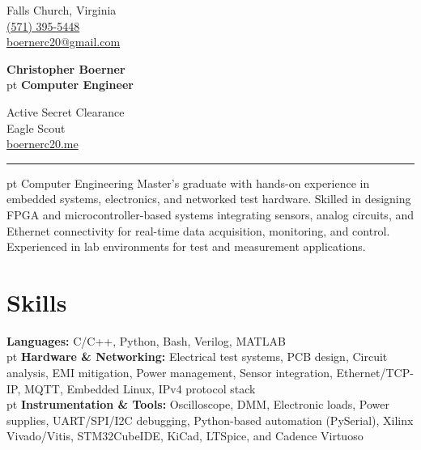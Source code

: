 \documentclass[9pt, letterpaper]{extarticle}
\newenvironment{threecolentry}[3][]{
    \onecolentry
    \def\thirdColumn{#3}
    \setcolumnwidth{, \fill, \fill, \fill}
    \begin{paracol}{3}
    {\raggedright #2} \switchcolumn
    \begin{center}  %
}{
    \end{center}
    \switchcolumn \raggedleft \thirdColumn
    \end{paracol}
    \endonecolentry
} %
\let\hrefWithoutArrow\href
\begin{document}
    \newcommand{\AND}{\unskip
        \cleaders\copy\ANDbox\hskip\wd\ANDbox
        \ignorespaces
    }
    \newsavebox\ANDbox
    \sbox\ANDbox{$|$}
    \begin{threecolentry}
        {
            Falls Church, Virginia\\
            \hrefWithoutArrow{tel:+1-571-395-5448}{(571) 395-5448}\\
            \hrefWithoutArrow{mailto:boernerc20@gmail.com}{boernerc20@gmail.com}
        }
        {
            Active Secret Clearance \\
            Eagle Scout \\
            \hrefWithoutArrow{https://www.boernerc20.me}{boernerc20.me} \\
        }
        {
            \Huge\textbf{{Christopher Boerner}}\\
             pt%
            \Large{\textbf{Computer Engineer}}
        }
    \end{threecolentry}
    \hrule
     pt%
    Computer Engineering Master's graduate with hands-on experience in embedded systems, electronics, and networked test hardware. Skilled in designing FPGA and microcontroller-based systems integrating sensors, analog circuits, and Ethernet connectivity for real-time data acquisition, monitoring, and control. Experienced in lab environments for test and measurement applications.

    \section{Skills}
    \textbf{Languages: }C/C++, Python, Bash, Verilog, MATLAB\\
     pt%
    \textbf{Hardware \& Networking: }Electrical test systems, PCB design, Circuit analysis, EMI mitigation, Power management, Sensor integration, Ethernet/TCP-IP, MQTT, Embedded Linux, IPv4 protocol stack\\
     pt%
    \textbf{Instrumentation \& Tools: }Oscilloscope, DMM, Electronic loads, Power supplies, UART/SPI/I2C debugging, Python-based automation (PySerial), Xilinx Vivado/Vitis, STM32CubeIDE, KiCad, LTSpice, and Cadence Virtuoso

    
\end{document}
